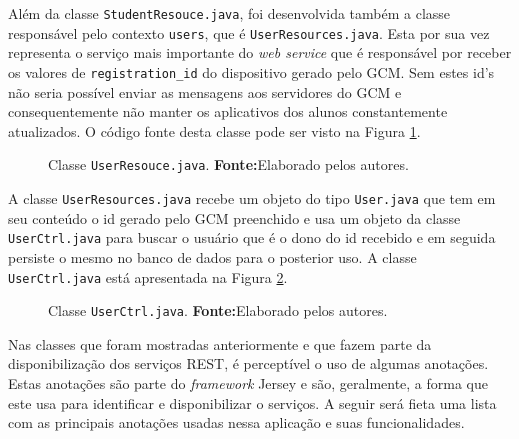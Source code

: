 	\par Além da classe \texttt{StudentResouce.java}, foi desenvolvida também a
classe responsável pelo contexto \texttt{users},
que é \texttt{UserResources.java}. Esta por sua vez representa o serviço mais
importante do \textit{web service} que é responsável por receber os valores de
\texttt{registration\_id} do dispositivo gerado pelo GCM. Sem estes  id's não
seria possível enviar as mensagens aos servidores do GCM e consequentemente não
manter os aplicativos dos alunos constantemente atualizados. O código fonte
desta classe pode ser visto na Figura \ref{fig:desws26}.

	\begin{figure}[h!]
		
		\caption[Classe UserResouce.java]{Classe \texttt{UserResouce.java}.
		\textbf{Fonte:}Elaborado pelos autores.}
		\label{fig:desws26}
	\end{figure}
	
	\par A classe \texttt{UserResources.java} recebe um objeto do tipo
\texttt{User.java} que tem em seu conteúdo o id gerado pelo GCM preenchido e
usa um objeto da classe \texttt{UserCtrl.java} para buscar o usuário que é o
dono do id recebido e em seguida persiste o mesmo no banco de dados para o
posterior uso. A classe \texttt{UserCtrl.java} está apresentada na Figura
\ref{fig:desws27}.

	\begin{figure}[h!]
		
		\caption[Classe UserCtrl.java]{Classe \texttt{UserCtrl.java}.
		\textbf{Fonte:}Elaborado pelos autores.}
		\label{fig:desws27}
	\end{figure}
	
	\pagebreak
	
	\par Nas classes que foram mostradas anteriormente e que fazem parte da
disponibilização dos serviços REST, é perceptível o uso de algumas anotações.
Estas anotações são parte do \textit{framework} Jersey e são, geralmente, a forma que
este usa para identificar e disponibilizar o serviços. A seguir será fieta uma
lista com as principais anotações usadas nessa aplicação e suas funcionalidades.

